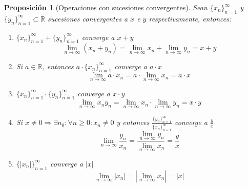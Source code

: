\documentclass[10pt,a4paper,openright]{book}
\theoremstyle{break}
\newtheorem*{prop}{Proposición}
\begin{document}
\begin{prop}[Operaciones con sucesiones convergentes]
Sean $\{x_n\}_{n=1}^\infty$ y $\{y_n\}_{n=1}^\infty \subset \mathbb R$ sucesiones convergentes a $x$ e $y$ respectivamente, entonces:
\begin{enumerate}
\item $\{x_n\}_{n=1}^\infty+\{y_n\}_{n=1}^\infty$ converge a $x+y$
$$\lim_{n\rightarrow \infty}(x_n+y_n)=\lim_{n\rightarrow \infty} x_n + \lim_{n\rightarrow \infty} y_n = x+y$$

\item Si $a\in \mathbb R$, entonces $a\cdot \{x_n\}_{n=1}^\infty$ converge a $a\cdot x$
$$\lim_{n\rightarrow \infty} a\cdot x_n=a\cdot \lim_{n\rightarrow \infty} x_n=a \cdot x$$

\item $\{x_n\}_{n=1}^\infty\cdot \{y_n\}_{n=1}^\infty$ converge a $x\cdot y$
$$\lim_{n\rightarrow \infty} x_n y_n= \lim_{n\rightarrow \infty} x_n \cdot \lim_{n\rightarrow \infty} y_n= x\cdot y$$

\item Si $x\neq 0\Rightarrow \exists n_0: \forall n\geq 0: x_n\neq 0$ y entonces $\frac{\{y_n\}_{n=1}^\infty}{\{x_n\}_{n=1}^\infty}$ converge a $\frac{y}{x}$
$$\lim_{n\rightarrow \infty}\frac{y_n}{x_n}=\frac{\lim_{n\rightarrow \infty} y_n}{\lim_{n\rightarrow \infty} x_n}=\frac{y}{x}$$

\item $\{|x_n|\}_{n=1}^\infty$ converge a $|x|$
$$\lim_{n\rightarrow \infty} |x_n|=\left|\lim_{n\rightarrow \infty} x_n\right|=|x|$$
\end{enumerate}
\end{prop}
\end{document}
